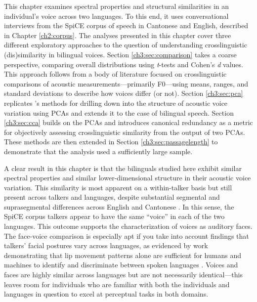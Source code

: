 This chapter examines spectral properties and structural similarities in an individual's voice across two languages. To this end, it uses conversational interviews from the SpiCE corpus of speech in Cantonese and English, described in Chapter \ref{ch2:corpus}. The analyses presented in this chapter cover three different exploratory approaches to the question of understanding crosslinguistic (dis)similarity in bilingual voices. Section \ref{ch3:sec:comparison} takes a coarse perspective, comparing overall distributions using \textit{t}-tests and Cohen's \textit{d} values. This approach follows from a body of literature focused on crosslinguistic comparisons of acoustic measurements---primarily F0---using means, ranges, and standard deviations to describe how voices differ (or not). Section \ref{ch3:sec:pca} replicates \citeauthor{lee_2019_acoustic}'s \citeyearpar{lee_2019_acoustic} methods for drilling down into the structure of acoustic voice variation using PCAs and extends it to the case of bilingual speech. Section \ref{ch3:sec:cca} builds on the PCAs and introduces canonical redundancy as a metric for objectively assessing crosslinguistic similarity from the output of two PCAs. These methods are then extended in Section \ref{ch3:sec:passagelength} to demonstrate that the analysis used a sufficiently large sample.

A clear result in this chapter is that the bilinguals studied here exhibit similar spectral properties and similar lower-dimensional structure in their acoustic voice variation. This similarity is most apparent on a within-talker basis but still present across talkers and languages, despite substantial segmental and suprasegmental differences across English and Cantonese \citep{matthews_2013_cantonese, wilson_2011_language}. In this sense, the SpiCE corpus talkers appear to have the same ``voice'' in each of the two languages. This outcome supports the characterization of voices as auditory faces. The face-voice comparison is especially apt if you take into account findings that talkers' facial postures vary across languages, as evidenced by work demonstrating that lip movement patterns alone are sufficient for humans and machines to identify and discriminate between spoken languages \citep{afouras_2020_now, sotofaraco_2007_discriminating}. Voices and faces are highly similar across languages but are not necessarily identical---this leaves room for individuals who are familiar with both the individuals and languages in question to excel at perceptual tasks in both domains.

